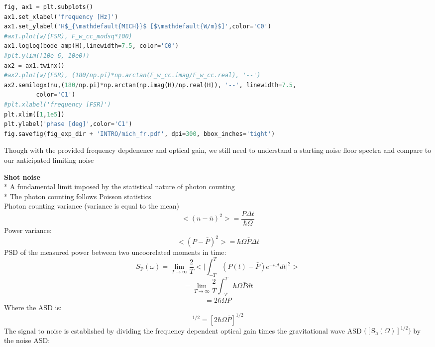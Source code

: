 \begin{spacing}{1.2} \begin{lstlisting}[frame=single, language=Python]
fig, ax1 = plt.subplots()
ax1.set_xlabel('frequency [Hz]')
ax1.set_ylabel('H$_{\mathdefault{MICH}}$ [$\mathdefault{W/m}$]',color='C0')
#ax1.plot(w/(FSR), F_w_cc_modsq*100)
ax1.loglog(bode_amp(H),linewidth=7.5, color='C0')
#plt.ylim([10e-6, 10e0])
ax2 = ax1.twinx()
#ax2.plot(w/(FSR), (180/np.pi)*np.arctan(F_w_cc.imag/F_w_cc.real), '--')
ax2.semilogx(nu,(180/np.pi)*np.arctan(np.imag(H)/np.real(H)), '--', linewidth=7.5,
	     color='C1')
#plt.xlabel('frequency [FSR]')
plt.xlim([1,1e5])
plt.ylabel('phase [deg]',color='C1')
fig.savefig(fig_exp_dir + 'INTRO/mich_fr.pdf', dpi=300, bbox_inches='tight')
\end{lstlisting} \end{spacing}

Though with the provided frequency depdenence and optical gain, we still
need to understand a starting noise floor spectra and compare to our
anticipated limiting noise 

\textbf{Shot noise} 
\\
* A fundamental limit imposed by the statistical nature of photon counting 
\\
* The photon counting follows Poisson statistics 
\\
\indent    * Photon counting variance (variance is equal to the
mean) 
\begin{equation} < (n-\bar{n})^2 >  = \frac{P \Delta t}{ \hbar \Omega} \end{equation} 
\indent * Power variance:
\begin{equation} < (P - \bar{P})^2 >  = \hbar \Omega  \bar{P} \Delta t \end{equation} 
\indent * PSD of the measured power between two uncoorelated moments in time:
\begin{equation} S_\mathrm{P} (\omega) = \lim_{T \to \infty} \frac{2}{T} \Big< \big| \int_{-T}^{T} (P(t) - \bar{P}) e^{-i\omega t} dt \big|^2 \Big> \end{equation}
\begin{equation} =  \lim_{T \to \infty} \frac{2}{T} \int_{-T}^{T} \hbar \Omega \bar{P} dt  \end{equation}
\begin{equation} = 2 \hbar \Omega \bar{P} \end{equation} 
\indent * Where the ASD is:
\begin{equation} [S_P (\omega)]^{1/2} = [2 \hbar \Omega \bar{P}]^{1/2}\end{equation}The signal to
noise is established by dividing the frequency dependent optical gain
times the gravitational wave ASD
\(\big( [\mathrm{S}_{\mathrm{h}}(\Omega)]^{1/2} \big)\) by the noise
ASD:

